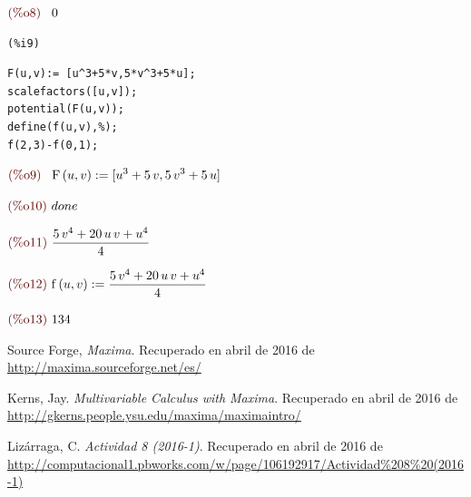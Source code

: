 \documentclass[12pt]{article}
\begin{document}
\begin{math}\displaystyle
\parbox{8ex}{\color{labelcolor}(\%o8) }
0
\end{math}


\noindent
\begin{minipage}[t]{8ex}{\color{red}\bf
\begin{verbatim}
(%i9) 
\end{verbatim}}
\end{minipage}
\begin{minipage}[t]{\textwidth}{\color{blue}
\begin{verbatim}
F(u,v):= [u^3+5*v,5*v^3+5*u];
scalefactors([u,v]);
potential(F(u,v));
define(f(u,v),%);
f(2,3)-f(0,1);
\end{verbatim}}
\end{minipage}
\begin{math}\displaystyle
\parbox{8ex}{\color{labelcolor}(\%o9) }
\mathrm{F}\left( u,v\right) :=[{u}^{3}+5\,v,5\,{v}^{3}+5\,u]
\end{math}

\begin{math}\displaystyle
\parbox{8ex}{\color{labelcolor}(\%o10) }
done
\end{math}

\begin{math}\displaystyle
\parbox{8ex}{\color{labelcolor}(\%o11) }
\frac{5\,{v}^{4}+20\,u\,v+{u}^{4}}{4}
\end{math}

\begin{math}\displaystyle
\parbox{8ex}{\color{labelcolor}(\%o12) }
\mathrm{f}\left( u,v\right) :=\frac{5\,{v}^{4}+20\,u\,v+{u}^{4}}{4}
\end{math}

\begin{math}\displaystyle
\parbox{8ex}{\color{labelcolor}(\%o13) }
134
\end{math}

\begin{thebibliography}{3}
Source Forge,
\emph{Maxima}. Recuperado en abril de 2016 de \url{http://maxima.sourceforge.net/es/}

Kerns, Jay.
\emph{Multivariable Calculus with Maxima}. Recuperado en abril de 2016 de \url{http://gkerns.people.ysu.edu/maxima/maximaintro/}

Lizárraga, C.
\emph{Actividad 8 (2016-1)}. Recuperado en abril de 2016 de \url{http://computacional1.pbworks.com/w/page/106192917/Actividad\%208\%20(2016-1)}
\end{thebibliography}
\end{document}
